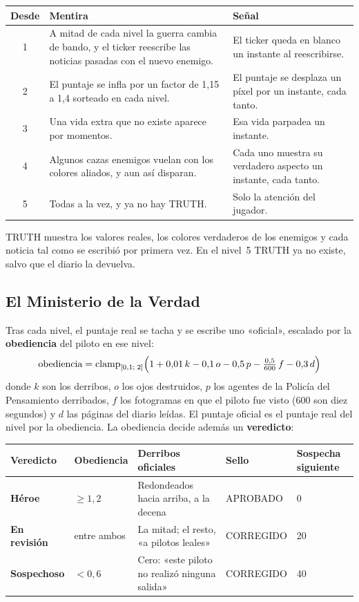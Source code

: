\documentclass[11pt,a4paper]{article}
\newcommand{\game}[1]{{\machine\large #1}}
\begin{document}
\begin{center}
\begin{tabularx}{\textwidth}{c >{\raggedright\arraybackslash}p{4cm} L}
  \toprule
  \textbf{Desde} & \textbf{Mentira} & \textbf{Señal} \\
   & A mitad de cada nivel la guerra cambia de bando, y el ticker reescribe las noticias pasadas con el nuevo enemigo. & El ticker queda en blanco un instante al reescribirse. \\
  2 & El puntaje se infla por un factor de 1,15 a 1,4 sorteado en cada nivel. & El puntaje se desplaza un píxel por un instante, cada tanto. \\
  3 & Una vida extra que no existe aparece por momentos. & Esa vida parpadea un instante. \\
  4 & Algunos cazas enemigos vuelan con los colores aliados, y aun así disparan. & Cada uno muestra su verdadero aspecto un instante, cada tanto. \\
  5 & Todas a la vez, y ya no hay TRUTH. & Solo la atención del jugador. \\
  \bottomrule
\end{tabularx}
\end{center}

TRUTH muestra los valores reales, los colores verdaderos de los enemigos y cada noticia tal como se escribió por primera vez. En el nivel~5 TRUTH ya no existe, salvo que el diario la devuelva.

\subsection{El Ministerio de la Verdad}

Tras cada nivel, el puntaje real se tacha y se escribe uno «oficial», escalado por la \textbf{obediencia} del piloto en ese nivel:
\[
  \text{obediencia} = \operatorname{clamp}_{[0{,}1;\;2]}\Bigl(1 + 0{,}01\,k - 0{,}1\,o - 0{,}5\,p - \tfrac{0{,}5}{600}\,f - 0{,}3\,d\Bigr)
\]
donde $k$ son los derribos, $o$ los ojos destruidos, $p$ los agentes de la Policía del Pensamiento derribados, $f$ los fotogramas en que el piloto fue visto (600 son diez segundos) y $d$ las páginas del diario leídas. El puntaje oficial es el puntaje real del nivel por la obediencia. La obediencia decide además un \textbf{veredicto}:

\begin{center}
\small
\begin{tabularx}{\textwidth}{>{\bfseries}l l L l l}
  \toprule
  \textbf{Veredicto} & \textbf{Obediencia} & \textbf{Derribos oficiales} & \textbf{Sello} & \textbf{Sospecha siguiente} \\
  \midrule
  Héroe & $\geq 1{,}2$ & Redondeados hacia arriba, a la decena & \game{\color{red}APROBADO} & 0 \\
  En revisión & entre ambos & La mitad; el resto, «a pilotos leales» & \game{\color{red}CORREGIDO} & 20 \\
  Sospechoso & $< 0{,}6$ & Cero: «este piloto no realizó ninguna salida» & \game{\color{red}CORREGIDO} & 40 \\
  \bottomrule
\end{tabularx}
\end{center}
\end{document}
